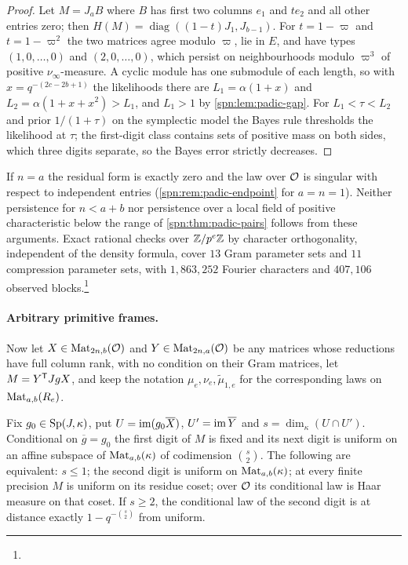 \begin{proof}
Let $M=J_aB$ where $B$ has first two columns $e_1$ and $te_2$ and all other entries zero; then
$H(M)=\operatorname{diag}((1-t)J_1,J_{b-1})$. For $t=1-\varpi$ and $t=1-\varpi^2$ the two matrices agree
modulo $\varpi$, lie in $E$, and have types $(1,0,\dots,0)$ and $(2,0,\dots,0)$, which persist on
neighbourhoods modulo $\varpi^3$ of positive $\nu_\infty$-measure. A cyclic module has one submodule of
each length, so with $x=q^{-(2c-2b+1)}$ the likelihoods there are $L_1=\alpha(1+x)$ and
$L_2=\alpha(1+x+x^2)>L_1$, and $L_1>1$ by \cref{spn:lem:padic-gap}. For $L_1<\tau<L_2$ and prior
$1/(1+\tau)$ on the symplectic model the Bayes rule thresholds the likelihood at $\tau$; the first-digit
class contains sets of positive mass on both sides, which three digits separate, so the Bayes error
strictly decreases.
\end{proof}

If $n=a$ the residual form is exactly zero and the law over $\mathcal{O}$ is singular with respect to
independent entries (\cref{spn:rem:padic-endpoint} for $a=n=1$). Neither persistence for $n<a+b$ nor
persistence over a local field of positive characteristic below the range of
\cref{spn:thm:padic-pairs} follows from these arguments. Exact rational checks over $\mathbb{Z}/p^e\mathbb{Z}$ by
character orthogonality, independent of the density formula, cover $13$ Gram parameter sets and $11$
compression parameter sets, with $1{,}863{,}252$ Fourier characters and $407{,}106$ observed
blocks.\footnote{}

\paragraph{Arbitrary primitive frames.}
Now let $X\in\operatorname{Mat}_{2n,b}(\mathcal{O})$ and $Y\in\operatorname{Mat}_{2n,a}(\mathcal{O})$ be any matrices whose reductions
have full column rank, with no condition on their Gram matrices, let $M=Y^{\mathsf{T}}JgX$, and keep
the notation $\mu_e,\nu_e,\widetilde\mu_{1,e}$ for the corresponding laws on
$\operatorname{Mat}_{a,b}(R_e)$.

\begin{theorem}\label{spn:thm:padic-tangent}
Fix $g_0\in\operatorname{Sp}(J,\kappa)$, put $U=\operatorname{im}(g_0\overline X)$, $U'=\operatorname{im}\overline Y$ and
$s=\dim_\kappa(U\cap U')$. Conditional on $\overline g=g_0$ the first digit of $M$ is fixed and its
next digit is uniform on an affine subspace of $\operatorname{Mat}_{a,b}(\kappa)$ of codimension $\binom s2$. The
following are equivalent: $s\le1$; the second digit is uniform on $\operatorname{Mat}_{a,b}(\kappa)$; at every
finite precision $M$ is uniform on its residue coset; over $\mathcal{O}$ its conditional law is Haar
measure on that coset. If $s\ge2$, the conditional law of the second digit is at distance exactly
$1-q^{-\binom s2}$ from uniform.
\end{theorem}

